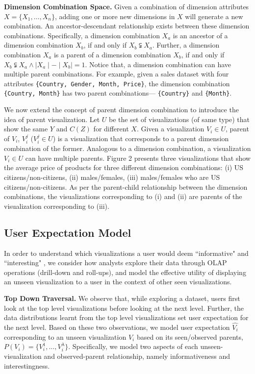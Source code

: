 \textbf{Dimension Combination Space.} Given a combination of dimension attributes $X = \{X_1, \ldots, X_n\}$, adding one or more new dimensions in $X$ will generate a new combination.  An ancestor-descendant relationship exists between these dimension combinations. Specifically, a dimension combination $X_a$ is an ancestor of a dimension combination $X_b$, if and only if $X_b \subsetneqq X_a$. Further,  a dimension combination $X_a$ is a parent of a dimension combination $X_b$, if and only if $X_b \subsetneqq X_a \land \mid X_a \mid - \mid X_b \mid = 1$. Notice that, a dimension combination can have multiple parent combinations. For example, given a sales dataset with four attributes {\tt\{Country, Gender, Month, Price\}}, the dimension combination {\tt\{Country, Month\}} has two parent combinations--- {\tt\{Country\}} and {\tt\{Month\}}. 

We now extend the concept of parent dimension combination to introduce the idea of parent visualization. Let $U$ be the set of visualizations (of same type) that show the same $Y$ and $C(Z)$ for different $X$. Given a visualization $V_i \in U$, parent of $V_i$, $V_i^j$ ($V_i^j\in U$) is a visualization that corresponds to a parent dimension combination of the former. Analogous to a dimension combination, a visualization $V_i \in U$ can have multiple parents. Figure 2 presents three visualizations that show the average price of products for three different dimension combinations: (i) US citizens/non-citizens, (ii) males/females, (iii) males/females who are US citizens/non-citizens. As per the parent-child relationship between the dimension combinations, the visualizations corresponding to (i) and (ii) are parents of the visualization corresponding to (iii).

\subsection{User Expectation Model}
In order to understand which visualizations a user would deem ``informative" and ``interesting" , we consider how analysts explore their data through OLAP operations (drill-down and roll-ups), and model the effective utility of displaying an unseen visualization to a user in the context of other seen visualizations. 

\textbf{Top Down Traversal.} We observe that, while exploring a dataset, users first look at the top level visualizations before looking at the next level. Further, the data distributions learnt from the top level visualizations set user expectation for the next level. Based on these two observations, we model user expectation $\hat{V_i}$ corresponding to an unseen visualization $V_i$ based on its seen/observed parents, $P(V_i) = \{V_i^1, \ldots, V_i^\lambda\}$. Specifically, we model two aspects of each unseen-visualization and observed-parent relationship, namely informativeness and interestingness. 


